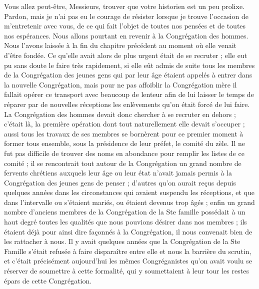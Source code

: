 Vous allez peut-être, Messieurs, trouver que votre historien est un peu prolixe. Pardon, mais je n'ai pas eu le courage de résister lorsque je trouve l'occasion de m'entretenir avec vous, de ce qui fait l'objet de toutes nos pensées et de toutes nos espérances. Nous allons pourtant en revenir à la Congrégation des hommes. Nous l'avons laissée à la fin du chapitre précédent au moment où elle venait d'être fondée. Ce qu'elle avait alors de plus urgent était de se recruter ; elle eut pu sans doute le faire très rapidement, si elle eût admis de suite tous les membres de la Congrégation des jeunes gens qui par leur âge étaient appelés à entrer dans la nouvelle Congrégation, mais pour ne pas affoiblir la Congrégation mère il fallait opérer ce transport avec beaucoup de lenteur afin de lui laisser le temps de réparer par de nouvelles réceptions les enlèvements
qu'on était forcé de lui faire. La Congrégation des hommes devait donc chercher à se recruter en dehors ; c'était là, la première opération dont tout naturellement elle devait s'occuper ; aussi tous les travaux de ses membres se bornèrent pour ce premier moment à former tous ensemble, sous la présidence de leur préfet, le comité du zèle. Il ne fut pas difficile de trouver des noms en abondance pour remplir les listes de ce comité ; il se rencontrait tout autour de la Congrégation un grand nombre de fervents chrétiens auxquels leur âge ou leur état n'avait jamais permis à la Congrégation des jeunes gens de penser ; d'autres qu'on aurait reçus depuis quelques années dans les circonstances qui avaient suspendu les réceptions, et que dans l'intervalle ou s'étaient mariés, ou étaient devenus trop âgés ; enfin un grand nombre d'anciens membres de la Congrégation de la Ste famille possédait à un haut degré toutes les qualités que nous pouvions désirer dans nos membres ; ils étaient déjà pour ainsi dire façonnés à la Congrégation, il nous convenait bien de les rattacher à nous. Il y avait quelques années que la Congrégation de la Ste Famille s'était refusée à faire disparaître entre elle et nous la barrière du scrutin, et c'était précisément aujourd'hui les mêmes Congréganistes qu'on avait voulu se réserver de soumettre à cette formalité, qui y soumettaient à leur tour les restes épars de cette Congrégation.

